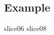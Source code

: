 \subsection*{Example}
\label{sec:experimental.example}


{slice06}
{slice08}

\lstset{basicstyle=\small\ttfamily}
